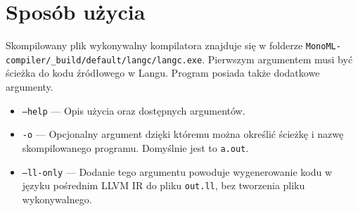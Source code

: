 \documentclass[declaration,shortabstract]{iithesis}
\begin{document}











\section{Sposób użycia}
Skompilowany plik wykonywalny kompilatora znajduje się w folderze \newline
\texttt{MonoML-compiler/\_build/default/langc/langc.exe}. Pierwszym argumentem 
musi być ścieżka do kodu źródłowego w Langu. Program posiada także dodatkowe 
argumenty. 

\begin{itemize}
  \item \texttt{--help} --- Opis użycia oraz dostępnych argumentów. 
  \item \texttt{-o} --- Opcjonalny argument dzięki któremu można określić 
  ścieżkę i nazwę skompilowanego programu. Domyślnie jest to \texttt{a.out}.
  \item \texttt{--ll-only} --- Dodanie tego argumentu powoduje wygenerowanie 
  kodu w języku pośrednim LLVM IR do pliku \texttt{out.ll}, bez tworzenia pliku 
  wykonywalnego. 
\end{itemize}
\end{document}
